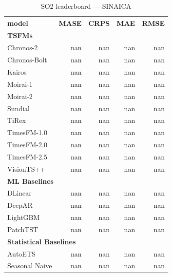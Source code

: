 \begin{table}[H]
\caption{SO2 leaderboard --- SINAICA}
\centering
\begin{small}
\begin{tabular}{lrrrr}
\toprule
model & MASE & CRPS & MAE & RMSE \\
\midrule
\multicolumn{5}{l}{\textbf{TSFMs}} \\
Chronos-2 & nan & nan & nan & nan \\
Chronos-Bolt & nan & nan & nan & nan \\
Kairos & nan & nan & nan & nan \\
Moirai-1 & nan & nan & nan & nan \\
Moirai-2 & nan & nan & nan & nan \\
Sundial & nan & nan & nan & nan \\
TiRex & nan & nan & nan & nan \\
TimesFM-1.0 & nan & nan & nan & nan \\
TimesFM-2.0 & nan & nan & nan & nan \\
TimesFM-2.5 & nan & nan & nan & nan \\
VisionTS++ & nan & nan & nan & nan \\
\midrule
\multicolumn{5}{l}{\textbf{ML Baselines}} \\
DLinear & nan & nan & nan & nan \\
DeepAR & nan & nan & nan & nan \\
LightGBM & nan & nan & nan & nan \\
PatchTST & nan & nan & nan & nan \\
\midrule
\multicolumn{5}{l}{\textbf{Statistical Baselines}} \\
AutoETS & nan & nan & nan & nan \\
Seasonal Naive & nan & nan & nan & nan \\
\bottomrule
\end{tabular}
\end{small}
\end{table}